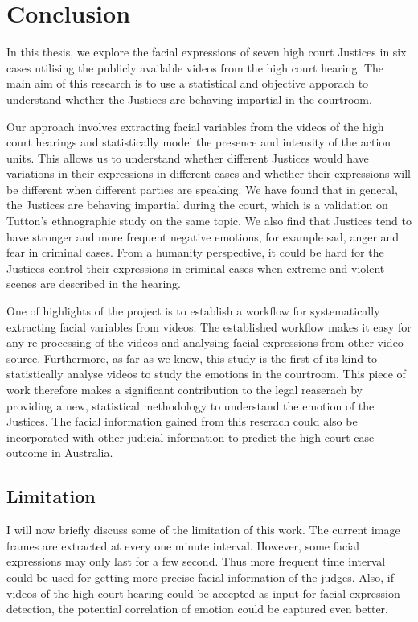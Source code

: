 \documentclass{monashthesis}
\begin{document}
\hypertarget{conclusion}{%
\chapter{Conclusion}\label{conclusion}}

In this thesis, we explore the facial expressions of seven high court Justices in six cases utilising the publicly available videos from the high court hearing. The main aim of this research is to use a statistical and objective apporach to understand whether the Justices are behaving impartial in the courtroom.

Our approach involves extracting facial variables from the videos of the high court hearings and statistically model the presence and intensity of the action units. This allows us to understand whether different Justices would have variations in their expressions in different cases and whether their expressions will be different when different parties are speaking. We have found that in general, the Justices are behaving impartial during the court, which is a validation on Tutton's ethnographic study on the same topic. We also find that Justices tend to have stronger and more frequent negative emotions, for example sad, anger and fear in criminal cases. From a humanity perspective, it could be hard for the Justices control their expressions in criminal cases when extreme and violent scenes are described in the hearing.

One of highlights of the project is to establish a workflow for systematically extracting facial variables from videos. The established workflow makes it easy for any re-processing of the videos and analysing facial expressions from other video source. Furthermore, as far as we know, this study is the first of its kind to statistically analyse videos to study the emotions in the courtroom. This piece of work therefore makes a significant contribution to the legal reaserach by providing a new, statistical methodology to understand the emotion of the Justices. The facial information gained from this reserach could also be incorporated with other judicial information to predict the high court case outcome in Australia.

\hypertarget{limitation}{%
\section{Limitation}\label{limitation}}

I will now briefly discuss some of the limitation of this work. The current image frames are extracted at every one minute interval. However, some facial expressions may only last for a few second. Thus more frequent time interval could be used for getting more precise facial information of the judges. Also, if videos of the high court hearing could be accepted as input for facial expression detection, the potential correlation of emotion could be captured even better.
\end{document}
